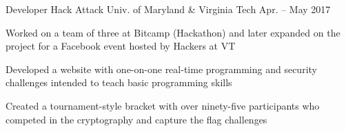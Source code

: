 

\begin{cventries}

  \cventry
    {Developer} %
    {Hack Attack} %
    {Univ. of Maryland \& Virginia Tech} %
    {Apr. – May 2017} %
    {
      \begin{cvitems} %
      \item {Worked on a team of three at Bitcamp (Hackathon) and later expanded on the project for a Facebook event hosted by Hackers at VT}
      \item {Developed a website with one-on-one real-time programming and security challenges intended to teach basic programming skills}
      \item {Created a tournament-style bracket with over ninety-five participants who competed in the cryptography and capture the flag challenges}
      \end{cvitems}
    }

\end{cventries}
